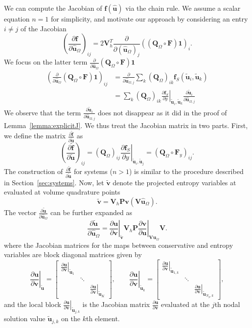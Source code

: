 \documentclass{article}
\renewcommand{\hat}{\widehat}
\renewcommand{\tilde}{\widetilde}
\newcommand{\pd}[2]{\frac{\partial#1}{\partial#2}}
\newcommand{\LRp}[1]{\left( #1 \right)}
\newcommand{\LRl}[1]{\left. #1 \right|}
\newcommand{\eq}[1]{\begin{align*}#1\end{align*}}
\newcommand{\bmat}[1]{\begin{bmatrix}#1\end{bmatrix}}
\begin{document}
We can compute the Jacobian of $\bm{f}(\hat{\bm{u}})$ via the chain rule.  We assume a scalar equation $n=1$ for simplicity, and motivate our approach by considering an entry $i\neq j$ of the Jacobian
\[
\LRp{\pd{\bm{f}}{\hat{\bm{u}}_{\Omega}}}_{ij} =  2 \bm{V}_h^T \pd{}{\LRp{\hat{\bm{u}}_{\Omega}}_j} \LRp{\LRp{\bm{Q}_{\Omega}\circ\bm{F}}\bm{1}}_i.
\]
We focus on the latter term $\pd{}{\hat{\bm{u}}_{\Omega}} \LRp{\bm{Q}_{\Omega}\circ\bm{F}}\bm{1}$
\eq{
\LRp{\pd{}{\hat{\bm{u}}_{\Omega}} \LRp{\bm{Q}_{\Omega}\circ\bm{F}}\bm{1}}_{ij} &= \pd{}{\hat{\bm{u}}_{\Omega,j}} \sum_{k} \LRp{\bm{Q}_{\Omega}}_{ik} \bm{f}_S\LRp{\tilde{\bm{u}}_i,\tilde{\bm{u}}_k} \\
&=  \sum_{k} \LRp{\bm{Q}_{\Omega}}_{ik} \LRl{\pd{\bm{f}_S}{y}}_{\tilde{\bm{u}}_i,\tilde{\bm{u}}_k} \pd{\tilde{\bm{u}}_i}{\hat{\bm{u}}_{\Omega,j}}
}
We observe that the term $\pd{\tilde{\bm{u}}_i}{\hat{\bm{u}}_{\Omega,j}}$ does not disappear as it did in the proof of Lemma~\ref{lemma:explicitJ}.  We thus treat the Jacobian matrix in two parts.  First, we define the matrix $\pd{\tilde{\bm{f}}}{\tilde{\bm{u}}}$ as
\[
\LRp{\pd{\tilde{\bm{f}}}{\tilde{\bm{u}}}}_{ij} = \LRp{\bm{Q}_{\Omega}}_{ij} \LRl{\pd{\bm{f}_S}{y}}_{\tilde{\bm{u}}_i,\tilde{\bm{u}}_j} = \LRp{\bm{Q}_{\Omega}\circ \bm{F}_y}_{ij}.
\]
The construction of $\pd{\tilde{\bm{f}}}{\tilde{\bm{u}}}$ for systems ($n > 1$) is similar to the procedure described in Section~\ref{sec:systems}.
Now, let $\tilde{\bm{v}}$ denote the projected entropy variables at evaluated at volume quadrature points
\[
\tilde{\bm{v}} = \bm{V}_h\bm{P}\bm{v}\LRp{\bm{V}\hat{\bm{u}}_{\Omega}}.
\]
The vector $\pd{\tilde{\bm{u}}}{\hat{\bm{u}}_{\Omega}}$  can be further expanded as 
\[
\pd{\tilde{\bm{u}}}{\hat{\bm{u}}_{\Omega}} = \LRl{\pd{\bm{u}}{\bm{v}}}_{\tilde{\bm{v}}} \bm{V}_h \bm{P} \LRl{\pd{\bm{v}}{\bm{u}}}_{\bm{V}\hat{\bm{u}}_{\Omega}} \bm{V}.
\]
where the Jacobian matrices for the maps between conservative and entropy variables are block diagonal matrices given by
\[
\LRl{\pd{\bm{u}}{\bm{v}}}_{\tilde{\bm{u}}} = \bmat{
\LRl{\pd{\bm{u}}{\bm{v}}}_{\tilde{\bm{u}}_1} &&\\
& \ddots &\\
&& \LRl{\pd{\bm{u}}{\bm{v}}}_{\tilde{\bm{u}}_K}
}, \qquad \LRl{\pd{\bm{u}}{\bm{v}}}_{\tilde{\bm{u}}_k} = \bmat{
\LRl{\pd{\bm{u}}{\bm{v}}}_{\tilde{\bm{u}}_{1,k}} &&\\
 &\ddots &\\
&& \LRl{\pd{\bm{u}}{\bm{v}}}_{\tilde{\bm{u}}_{N_p,k}}
},
\]
and the local block $\LRl{\pd{\bm{u}}{\bm{v}}}_{\tilde{\bm{u}}_{j,k}}$ is the Jacobian matrix $\pd{\bm{u}}{\bm{v}}$ evaluated at the $j$th nodal solution value $\tilde{\bm{u}}_{j,k}$ on the $k$th element.
\end{document}
